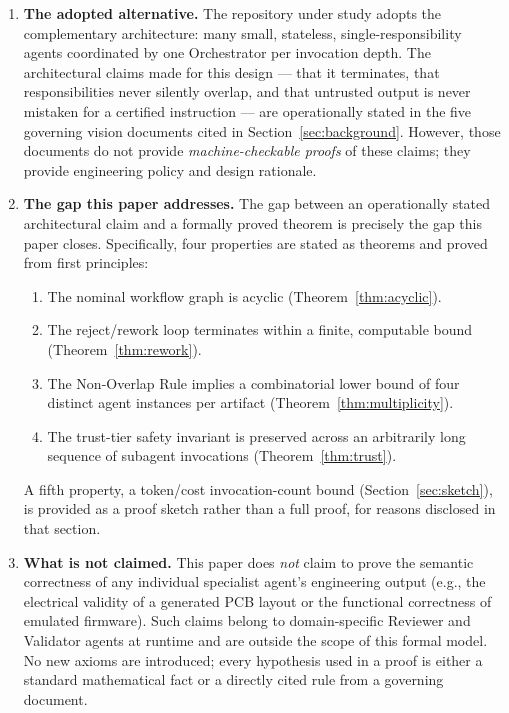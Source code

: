 \documentclass[12pt]{article}
\theoremstyle{definition}
\begin{document}
\begin{enumerate}
    \item \textbf{The adopted alternative.}
          The repository under study adopts the complementary architecture:
          many small, stateless, single-responsibility agents coordinated
          by one Orchestrator per invocation depth.
          The architectural claims made for this design --- that it
          terminates, that responsibilities never silently overlap, and that
          untrusted output is never mistaken for a certified instruction ---
          are operationally stated in the five governing vision documents
          cited in Section~\ref{sec:background}.
          However, those documents do not provide \emph{machine-checkable
          proofs} of these claims; they provide engineering policy and
          design rationale.

    \item \textbf{The gap this paper addresses.}
          The gap between an operationally stated architectural claim and a
          formally proved theorem is precisely the gap this paper closes.
          Specifically, four properties are stated as theorems and proved
          from first principles:
          \begin{enumerate}
              \item[G1.] The nominal workflow graph is acyclic
                         (Theorem~\ref{thm:acyclic}).
              \item[G2.] The reject/rework loop terminates within a
                         finite, computable bound
                         (Theorem~\ref{thm:rework}).
              \item[G3.] The Non-Overlap Rule implies a combinatorial lower
                         bound of four distinct agent instances per artifact
                         (Theorem~\ref{thm:multiplicity}).
              \item[G4.] The trust-tier safety invariant is preserved
                         across an arbitrarily long sequence of subagent
                         invocations (Theorem~\ref{thm:trust}).
          \end{enumerate}
          A fifth property, a token/cost invocation-count bound
          (Section~\ref{sec:sketch}), is provided as a proof sketch rather
          than a full proof, for reasons disclosed in that section.

    \item \textbf{What is not claimed.}
          This paper does \emph{not} claim to prove the semantic
          correctness of any individual specialist agent's engineering
          output (e.g., the electrical validity of a generated PCB layout
          or the functional correctness of emulated firmware).
          Such claims belong to domain-specific Reviewer and Validator
          agents at runtime and are outside the scope of this formal model.
          No new axioms are introduced; every hypothesis used in a proof
          is either a standard mathematical fact or a directly cited rule
          from a governing document.

\end{enumerate}
\end{document}
